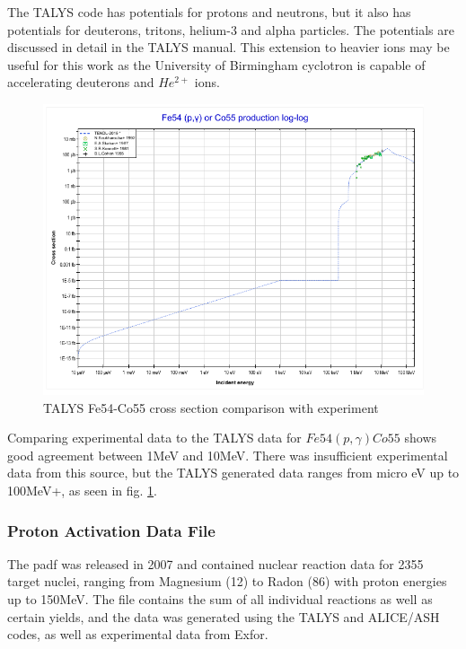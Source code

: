 The TALYS code has potentials for protons and neutrons, but it also has potentials for deuterons, tritons, helium-3 and alpha particles.  The potentials are discussed in detail in the TALYS manual\cite{talysmanual}.  This extension to heavier ions may be useful for this work as the University of Birmingham cyclotron is capable of accelerating deuterons and $He^{2+}$ ions.

\begin{figure}[h]
  \begin{center}
    \includegraphics[width=.75\linewidth]{chapters/isotope_activation_and_radioactive_decay/images/Fe54-Co55.png}
    \caption{TALYS Fe54-Co55 cross section comparison with experiment \cite{tendlfeco}}
    \label{fig:Fe54-Co55}
  \end{center}
\end{figure}

Comparing experimental data to the TALYS data for $Fe54(p, \gamma)Co55$ shows good agreement between 1MeV and 10MeV.  There was insufficient experimental data from this source, but the TALYS generated data ranges from micro eV up to 100MeV+, as seen in fig. \ref{fig:Fe54-Co55}\cite{tendlfeco}.


\FloatBarrier
\subsubsection{Proton Activation Data File}

The \acrfull{padf} was released in 2007 and contained nuclear reaction data for 2355 target nuclei, ranging from Magnesium (12) to Radon (86) with proton energies up to 150MeV.  The file contains the sum of all individual reactions as well as certain yields, and the data was generated using the TALYS and ALICE/ASH codes, as well as experimental data from Exfor\cite{exforlink}.

